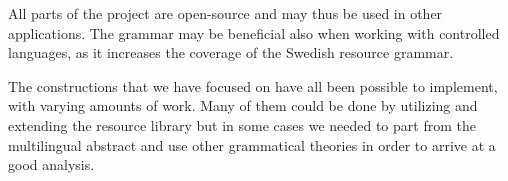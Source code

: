 \documentclass{report}
\begin{document}
All parts of the project are open-source and may thus be used in other applications.
The grammar may be beneficial also when working with controlled languages,
as it increases the coverage of the Swedish resource grammar.

The constructions
that we have focused on have all been possible to implement, with varying  amounts
of work. Many of them could be done by utilizing and extending the resource library
but in some cases we needed to part from the multilingual abstract and use other
grammatical theories in order to arrive at a good analysis.







\end{document}
